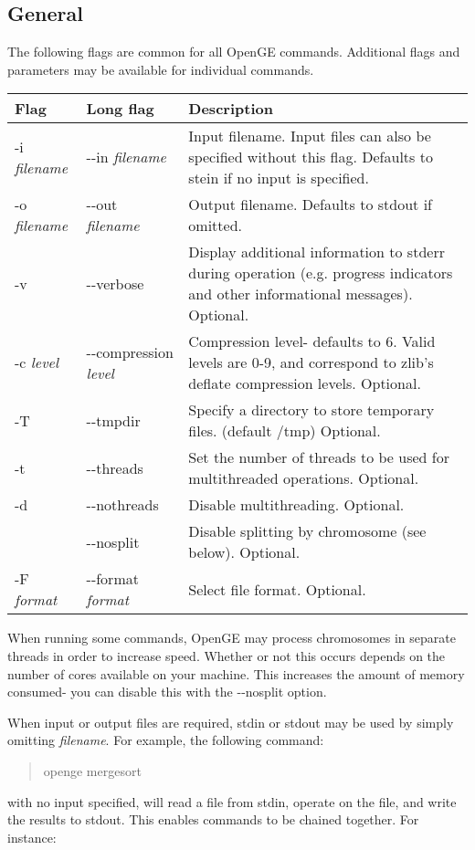 \documentclass[11pt]{article}
\newcommand {\cmd}[1] {\begin{quote}#1\end{quote}}
\begin{document}
\subsection {General}
The following flags are common for all OpenGE commands. Additional flags and parameters may be available for individual commands.
\begin{center}
\begin{tabular}{llp{3.5in}}
\hline
Flag&Long flag&Description\\ \hline
-i \textit{filename}&{-}{-}in \textit{filename}&Input filename. Input files can also be specified without this flag. Defaults to stein if no input is specified.\\
-o \textit{filename}&{-}{-}out \textit{filename}&Output filename. Defaults to stdout if omitted. \\
-v&{-}{-}verbose&Display additional information to stderr during operation (e.g. progress indicators and other informational messages). Optional.\\
-c \textit{level}&{-}{-}compression \textit{level}&Compression level- defaults to 6. Valid levels are 0-9, and correspond to zlib's deflate compression levels. Optional.\\
-T&{-}{-}tmpdir&Specify a directory to store temporary files. (default /tmp) Optional.\\
-t&{-}{-}threads&Set the number of threads to be used for multithreaded operations. Optional.\\
-d&{-}{-}nothreads&Disable multithreading. Optional.\\
&{-}{-}nosplit&Disable splitting by chromosome (see below). Optional.\\
-F \textit{format}&{-}{-}format \textit{format}&Select file format. Optional.\\
\end{tabular}
\end{center}

When running some commands, OpenGE may process chromosomes in separate threads in order to increase speed. Whether or not this occurs depends on the number of cores available on your machine. This increases the amount of memory consumed- you can disable this with the {-}{-}nosplit option.

When input or output files are required, stdin or stdout may be used by simply omitting \textit{filename}. For example, the following command:

\cmd{openge mergesort}

with no input specified, will read a file from stdin, operate on the file, and write the results to stdout. This enables commands to be chained together. For instance:
\end{document}
